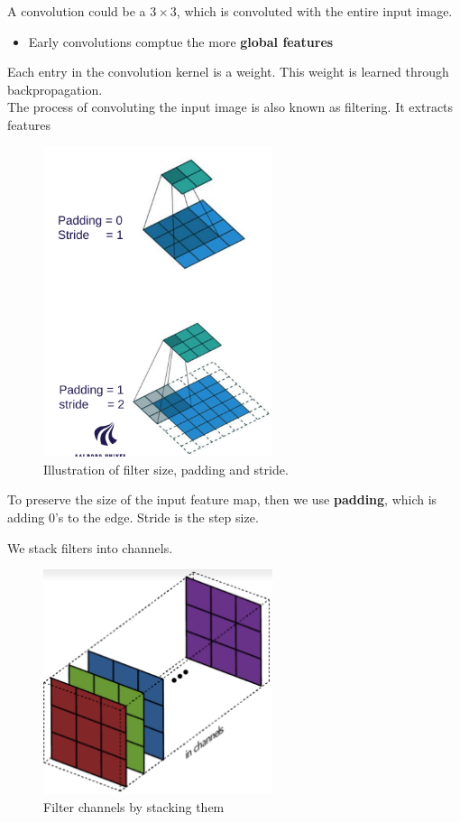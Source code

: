 \documentclass[a4paper]{article}
\begin{document}
A convolution could be a $ 3 \times 3 $, which is convoluted with the entire input image. 

\begin{itemize}
	\item Early convolutions comptue the more \textbf{global features} 
\end{itemize}

Each entry in the convolution kernel is a weight. This weight is learned through backpropagation.\\
The process of convoluting the input image is also known as filtering. It extracts features

\begin{figure}[H]
\centering
\includegraphics[width=0.6\textwidth]{figures/Stride_padding_size.png}
\caption{Illustration of filter size, padding and stride.}
\label{fig:stride_padding_size}
\end{figure} 

To preserve the size of the input feature map, then we use \textbf{padding}, which is adding $ 0  $'s to the edge. Stride is the step size.  



We stack filters into channels.
\begin{figure}[H]
\centering
\includegraphics[width=0.6\textwidth]{figures/filter_channels.png}
\caption{Filter channels by stacking them}
\label{fig:filter_channel}
\end{figure} 
\end{document}
